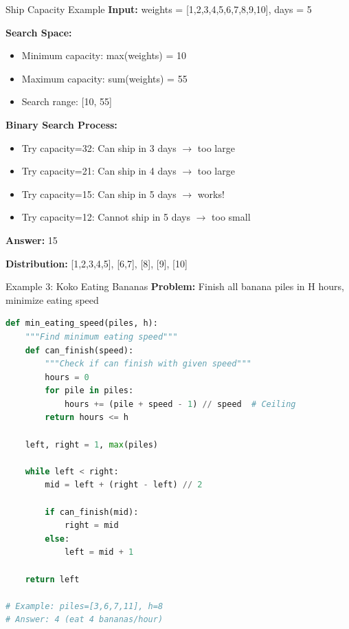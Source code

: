 \documentclass[aspectratio=169]{beamer}
\begin{document}
\begin{frame}{Ship Capacity Example}
  \textbf{Input:} weights = [1,2,3,4,5,6,7,8,9,10], days = 5

  \vspace{0.3cm}
  \textbf{Search Space:}
  \begin{itemize}
    \item Minimum capacity: max(weights) = 10
    \item Maximum capacity: sum(weights) = 55
    \item Search range: [10, 55]
  \end{itemize}

  \vspace{0.3cm}
  \textbf{Binary Search Process:}
  \begin{itemize}
    \item Try capacity=32: Can ship in 3 days $\rightarrow$ too large
    \item Try capacity=21: Can ship in 4 days $\rightarrow$ too large
    \item Try capacity=15: Can ship in 5 days $\rightarrow$ works!
    \item Try capacity=12: Cannot ship in 5 days $\rightarrow$ too small
  \end{itemize}

  \vspace{0.3cm}
  \textbf{Answer:} 15

  \textbf{Distribution:} [1,2,3,4,5], [6,7], [8], [9], [10]
\end{frame}

\begin{frame}[fragile]{Example 3: Koko Eating Bananas}
\textbf{Problem:} Finish all banana piles in H hours, minimize eating speed

\begin{lstlisting}[language=Python, basicstyle=\ttfamily\tiny]
def min_eating_speed(piles, h):
    """Find minimum eating speed"""
    def can_finish(speed):
        """Check if can finish with given speed"""
        hours = 0
        for pile in piles:
            hours += (pile + speed - 1) // speed  # Ceiling
        return hours <= h

    left, right = 1, max(piles)

    while left < right:
        mid = left + (right - left) // 2

        if can_finish(mid):
            right = mid
        else:
            left = mid + 1

    return left

# Example: piles=[3,6,7,11], h=8
# Answer: 4 (eat 4 bananas/hour)
\end{lstlisting}
\end{frame}
\end{document}
